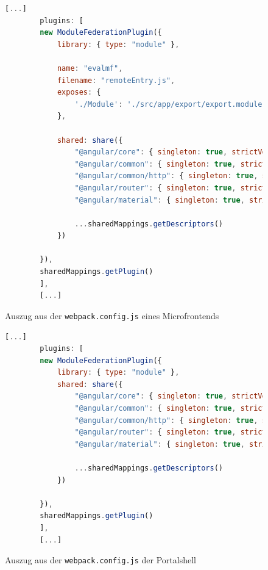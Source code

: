\newpage
\begin{figure}[bht]
	\begin{lstlisting}[caption=Konfiguration eines Module Federation Microfrontends, label=lst:WebpackConfigMF, language=Javascript]
		[...]
		plugins: [
		new ModuleFederationPlugin({
			library: { type: "module" },
			
			name: "evalmf",
			filename: "remoteEntry.js",
			exposes: {
				'./Module': './src/app/export/export.module.ts',
			},   
			
			shared: share({
				"@angular/core": { singleton: true, strictVersion: true, requiredVersion: 'auto' }, 
				"@angular/common": { singleton: true, strictVersion: true, requiredVersion: 'auto' }, 
				"@angular/common/http": { singleton: true, strictVersion: true,	requiredVersion: 'auto' }, 
				"@angular/router": { singleton: true, strictVersion: true, requiredVersion: 'auto' },
				"@angular/material": { singleton: true, strictVersion: true, requiredVersion: 'auto' },
				
				...sharedMappings.getDescriptors()
			})
			
		}),
		sharedMappings.getPlugin()
		],
		[...]
	\end{lstlisting}
	\footnoterule{}
	\footnotesize{Auszug aus der \texttt{webpack.config.js} eines Microfrontends}
\end{figure}

\newpage
\begin{figure}[bht]
	\begin{lstlisting}[caption=Konfiguration einer Module Federation Portalshell, label=lst:WebpackConfigPS, language=Javascript]	
		[...]
		plugins: [
		new ModuleFederationPlugin({
			library: { type: "module" },
			shared: share({
				"@angular/core": { singleton: true, strictVersion: true, requiredVersion: 'auto' }, 
				"@angular/common": { singleton: true, strictVersion: true, requiredVersion: 'auto' }, 
				"@angular/common/http": { singleton: true, strictVersion: true,	requiredVersion: 'auto' }, 
				"@angular/router": { singleton: true, strictVersion: true, requiredVersion: 'auto' },
				"@angular/material": { singleton: true, strictVersion: true, requiredVersion: 'auto' },
				
				...sharedMappings.getDescriptors()
			})
			
		}),
		sharedMappings.getPlugin()
		],
		[...]
	\end{lstlisting}
	\footnoterule{}
	\footnotesize{Auszug aus der \texttt{webpack.config.js} der Portalshell}
\end{figure}

